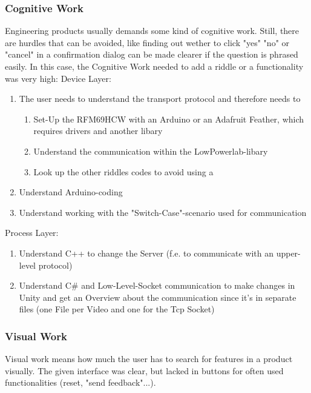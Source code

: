 \subsubsection{Cognitive Work}
Engineering products usually demands some kind of cognitive work. Still, there are hurdles that can be avoided,
like finding out wether to click "yes" "no" or "cancel" in a confirmation dialog can be made clearer if the question is phrased easily.
In this case, the Cognitive Work needed to add a riddle or a functionality was very high:
Device Layer:
\begin{enumerate}
    \item The user needs to understand the transport protocol and therefore needs to 
    \begin{enumerate}
        \item Set-Up the RFM69HCW with an Arduino or an Adafruit Feather, which requires drivers and another libary
        \item Understand the communication within the LowPowerlab-libary
        \item Look up the other riddles codes to avoid using a %
    \end{enumerate}   
    \item Understand Arduino-coding 
    \item Understand working with the "Switch-Case"-scenario used for communication 
\end{enumerate}  
Process Layer:
\begin{enumerate}
    \item Understand C++ to change the Server (f.e. to communicate with an upper-level protocol)
    \item Understand C\# and Low-Level-Socket communication to make changes in Unity 
    and get an Overview about the communication since it's in separate files (one File per Video and one for the Tcp Socket) 
\end{enumerate}  

\subsubsection{Visual Work}
Visual work means how much the user has to search for features in a product visually.
The given interface was clear, but lacked in buttons for often used functionalities (reset, "send feedback"...).

